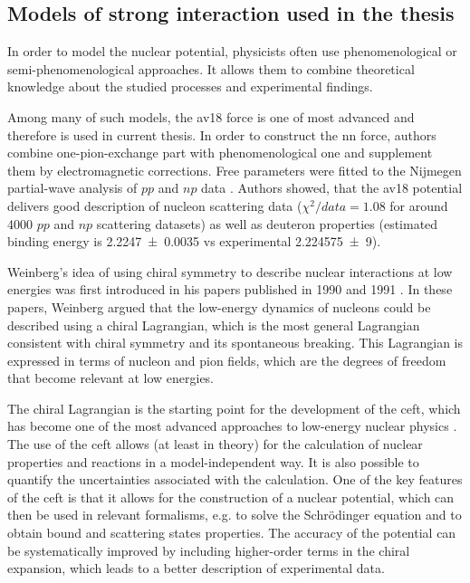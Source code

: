 \subsection*{Models of strong interaction used in the thesis}

In order to model the nuclear potential, physicists often use phenomenological
or semi-phenomenological approaches. It allows them to combine
theoretical knowledge about the studied processes and experimental findings.

Among many of such models, the \gls{av18} \cite{AV18Wiringa} force is one of most
advanced and therefore is used in current thesis.
In order to construct the \gls{nn} force, authors combine
one-pion-exchange part
with phenomenological one and supplement them by electromagnetic corrections.
Free parameters were fitted to
the Nijmegen partial-wave analysis of $pp$ and $np$ data \cite{NijmegenPhysRevC.48.792}. 
Authors showed, that the \gls{av18} potential delivers good 
description of nucleon scattering data ($\chi ^2/data = 1.08$ for around \num{4000} $pp$ and $np$ scattering datasets) 
as well as deuteron properties (estimated binding energy is \SI{2.2247(35)}{\mev} vs experimental \SI{ 2.224 575(9)}{\mev}).

Weinberg's idea of using chiral symmetry to describe nuclear interactions at low
energies was first introduced in his papers published in 1990 and 1991 \cite{WEINBERG1990,WEINBERG1991}.
In these papers, Weinberg argued that the low-energy dynamics of nucleons
could be described using a chiral Lagrangian, which is the most general
Lagrangian consistent with chiral symmetry and its spontaneous breaking.
This Lagrangian is expressed in terms of nucleon and pion fields,
which are the degrees of freedom that become relevant at low energies.

The chiral Lagrangian is the starting point for the development of
the \gls{ceft}, which has become one of the
most advanced approaches to low-energy nuclear physics \cite{EpelHam2008}.
The use of the \gls{ceft} allows (at least in theory) for the calculation of nuclear properties
and reactions in a model-independent way.
It is also possible to
quantify the uncertainties associated with the calculation. One of the
key features of the \gls{ceft} is that it allows for the construction of
a nuclear potential, which can then be used in relevant formalisms, e.g. to solve the Schr\"odinger
equation and to obtain bound and scattering states properties. The accuracy of the
potential can be systematically improved by including higher-order
terms in the chiral expansion, which leads to a better description of
experimental data.

